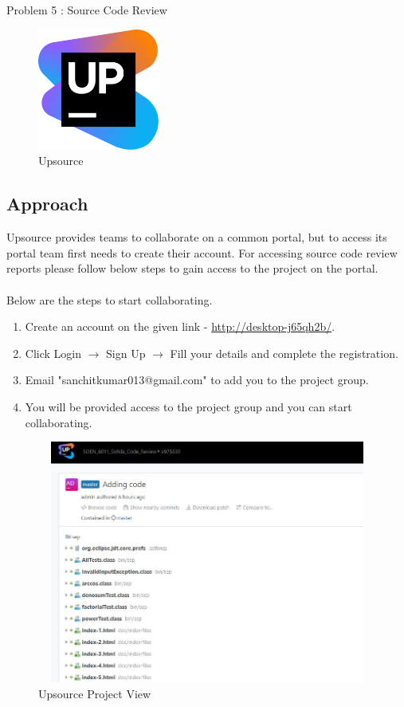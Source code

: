 \documentclass[a4paper,12pt]{article}
\begin{document}
\begin{section}{Problem 5 : Source Code Review}
\begin{figure}[htp]
	\centering
	\includegraphics[width=4cm]{Upsource_logo.jpg}
	\caption{Upsource}
	\label{fig:galaxy}
\end{figure}


\end{section}


\vspace{3cm}

\subsection{Approach}
Upsource provides teams to collaborate on a common portal, but to access its portal team first needs to create their account. For accessing source code review reports please follow below steps to gain access to the project on the portal.
\\ \\
Below are the steps to start collaborating. 

\begin{enumerate}
	\item Create an account on the given link - \url{http://desktop-j65qh2b/}.
	\item Click Login $\rightarrow$ Sign Up $\rightarrow$ Fill your details and complete the registration.
	\item Email "sanchitkumar013@gmail.com" to add you to the project group. 
	\item You will be provided access to the project group and you can start collaborating.
\end{enumerate}

\begin{figure}[htp]
	\centering
	\includegraphics[width=12cm,height=8cm,keepaspectratio]{Project_View.jpg}
	\caption{Upsource Project View}
	\label{fig:galaxy}
\end{figure}
\end{document}
